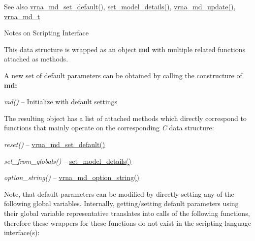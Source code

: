 \begin{DoxySeeAlso}{See also}
\hyperlink{group__model__details_ga8ac6ff84936282436f822644bf841f66}{vrna\+\_\+md\+\_\+set\+\_\+default()}, \hyperlink{group__model__details_gabad896c3650d420f3f3ddefc69e2bceb}{set\+\_\+model\+\_\+details()}, \hyperlink{group__model__details_ga36ae40b8c3b82362f5798ad5b047b814}{vrna\+\_\+md\+\_\+update()}, \hyperlink{group__model__details_ga1f8a10e12a0a1915f2a4eff0b28ea17c}{vrna\+\_\+md\+\_\+t}
\end{DoxySeeAlso}
\begin{DoxyRefDesc}{Notes on Scripting Interface}
\item[\hyperlink{scripting__scripting000002}{Notes on Scripting Interface}]This data structure is wrapped as an object {\bfseries md} with multiple related functions attached as methods.

A new set of default parameters can be obtained by calling the constructure of {\bfseries md\+:} ~\newline

\begin{DoxyItemize}
\item {\itshape md()} -- Initialize with default settings
\end{DoxyItemize}

The resulting object has a list of attached methods which directly correspond to functions that mainly operate on the corresponding {\itshape C} data structure\+:~\newline

\begin{DoxyItemize}
\item {\itshape reset()} -- \hyperlink{group__model__details_ga8ac6ff84936282436f822644bf841f66}{vrna\+\_\+md\+\_\+set\+\_\+default()}
\item {\itshape set\+\_\+from\+\_\+globals()} -- \hyperlink{group__model__details_gabad896c3650d420f3f3ddefc69e2bceb}{set\+\_\+model\+\_\+details()}
\item {\itshape option\+\_\+string()} -- \hyperlink{group__model__details_ga3a7469f0725a849af6ba61a57dfd60ce}{vrna\+\_\+md\+\_\+option\+\_\+string()}
\end{DoxyItemize}

Note, that default parameters can be modified by directly setting any of the following global variables. Internally, getting/setting default parameters using their global variable representative translates into calls of the following functions, therefore these wrappers for these functions do not exist in the scripting language interface(s)\+:


\end{DoxyRefDesc}
